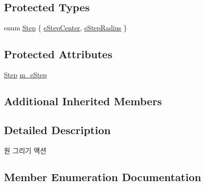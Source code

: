 \subsection*{Protected Types}
\begin{DoxyCompactItemize}
\item 
enum \hyperlink{class_c_g3_d_action_create_circle_a2fa7318e1c32b4332d746936b0eb04fd}{Step} \{ \hyperlink{class_c_g3_d_action_create_circle_a2fa7318e1c32b4332d746936b0eb04fdae3e6e3f12919a1a3b30a511957bfdbaf}{e\+Step\+Center}, 
\hyperlink{class_c_g3_d_action_create_circle_a2fa7318e1c32b4332d746936b0eb04fda88365844bff1a36b301ecdc6f047e369}{e\+Step\+Radius}
 \}
\end{DoxyCompactItemize}
\subsection*{Protected Attributes}
\begin{DoxyCompactItemize}
\item 
\hyperlink{class_c_g3_d_action_create_circle_a2fa7318e1c32b4332d746936b0eb04fd}{Step} \hyperlink{class_c_g3_d_action_create_circle_ac73bf36bcfab0ce53dd010c195ec6d87}{m\+\_\+e\+Step}
\end{DoxyCompactItemize}
\subsection*{Additional Inherited Members}


\subsection{Detailed Description}

\begin{DoxyItemize}
\item 원 그리기 액션 
\end{DoxyItemize}

\subsection{Member Enumeration Documentation}
\hypertarget{class_c_g3_d_action_create_circle_a2fa7318e1c32b4332d746936b0eb04fd}{}
